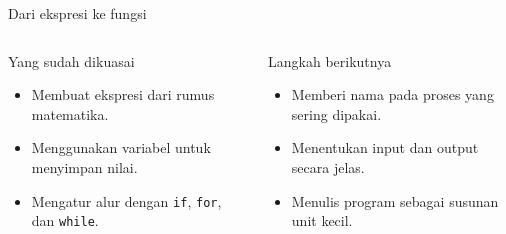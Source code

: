 \documentclass[aspectratio=169,11pt]{beamer}
\begin{document}
\begin{frame}{Dari ekspresi ke fungsi}
\begin{columns}[T]
\begin{block}{Yang sudah dikuasai}
\begin{itemize}
  \item Membuat ekspresi dari rumus matematika.
  \item Menggunakan variabel untuk menyimpan nilai.
  \item Mengatur alur dengan \texttt{if}, \texttt{for}, dan \texttt{while}.
\end{itemize}
\end{block}
\begin{block}{Langkah berikutnya}
\begin{itemize}
  \item Memberi nama pada proses yang sering dipakai.
  \item Menentukan input dan output secara jelas.
  \item Menulis program sebagai susunan unit kecil.
\end{itemize}
\end{block}
\end{columns}
\vspace{2mm}
\begin{center}
\end{center}
\end{frame}
\end{document}

